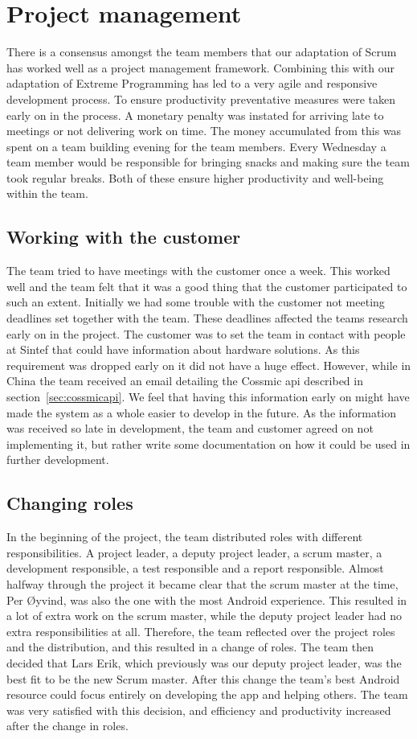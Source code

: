 \section{Project management}
There is a consensus amongst the team members that our adaptation of Scrum has worked well as a project management framework. Combining this with our adaptation of Extreme Programming has led to a very agile and responsive development process. To ensure productivity preventative measures were taken early on in the process. A monetary penalty was instated for arriving late to meetings or not delivering work on time. The money accumulated from this was spent on a team building evening for the team members. Every Wednesday a team member would be responsible for bringing snacks and making sure the team took regular breaks. Both of these ensure higher productivity and well-being within the team.

\subsection{Working with the customer}
The team tried to have meetings with the customer once a week. This worked well and the team felt that it was a good thing that the customer participated to such an extent. Initially we had some trouble with the customer not meeting deadlines set together with the team. These deadlines affected the teams research early on in the project. The customer was to set the team in contact with people at Sintef that could have information about hardware solutions. As this requirement was dropped early on it did not have a huge effect. However, while in China the team received an email detailing the Cossmic api described in section~\ref{sec:cossmicapi}. We feel that having this information early on might have made the system as a whole easier to develop in the future. As the information was received so late in development, the team and customer agreed on not implementing it, but rather write some documentation on how it could be used in further development.

\subsection{Changing roles}
\label{sec:unbalancedWorkload}
In the beginning of the project, the team distributed roles with different responsibilities. A project leader, a deputy project leader, a scrum master, a development responsible, a test responsible and a report responsible. Almost halfway through the project it became clear that the scrum master at the time, Per Øyvind, was also the one with the most Android experience. This resulted in a lot of extra work on the scrum master, while the deputy project leader had no extra responsibilities at all. Therefore, the team reflected over the project roles and the distribution, and this resulted in a change of roles. The team then decided that Lars Erik, which previously was our deputy project leader, was the best fit to be the new Scrum master. After this change the team's best Android resource could focus entirely on developing the app and helping others. The team was very satisfied with this decision, and efficiency and productivity increased after the change in roles.

